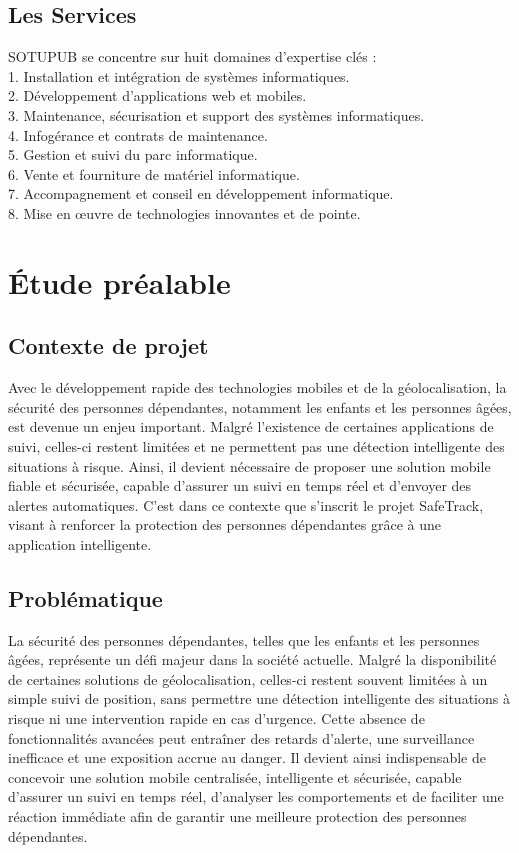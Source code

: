 \subsection{Les Services}
SOTUPUB se concentre sur huit domaines d'expertise clés :
\\
1. Installation et intégration de systèmes informatiques.
\\
2. Développement d'applications web et mobiles.
\\
3. Maintenance, sécurisation et support des systèmes informatiques.
\\
4. Infogérance et contrats de maintenance.
\\
5. Gestion et suivi du parc informatique.
\\
6. Vente et fourniture de matériel informatique.
\\
7. Accompagnement et conseil en développement informatique.
\\
8. Mise en œuvre de technologies innovantes et de pointe.

\section{Étude préalable}
\subsection{Contexte de projet}
Avec le développement rapide des technologies mobiles et de la géolocalisation, la sécurité des personnes dépendantes, notamment les enfants et les personnes âgées, est devenue un enjeu important. Malgré l'existence de certaines applications de suivi, celles-ci restent limitées et ne permettent pas une détection intelligente des situations à risque. Ainsi, il devient nécessaire de proposer une solution mobile fiable et sécurisée, capable d'assurer un suivi en temps réel et d'envoyer des alertes automatiques. C'est dans ce contexte que s'inscrit le projet SafeTrack, visant à renforcer la protection des personnes dépendantes grâce à une application intelligente.

\subsection{Problématique}


La sécurité des personnes dépendantes, telles que les enfants et les personnes âgées, représente un défi majeur dans la société actuelle. Malgré la disponibilité de certaines solutions de géolocalisation, celles-ci restent souvent limitées à un simple suivi de position, sans permettre une détection intelligente des situations à risque ni une intervention rapide en cas d'urgence. Cette absence de fonctionnalités avancées peut entraîner des retards d'alerte, une surveillance inefficace et une exposition accrue au danger. Il devient ainsi indispensable de concevoir une solution mobile centralisée, intelligente et sécurisée, capable d'assurer un suivi en temps réel, d'analyser les comportements et de faciliter une réaction immédiate afin de garantir une meilleure protection des personnes dépendantes.

